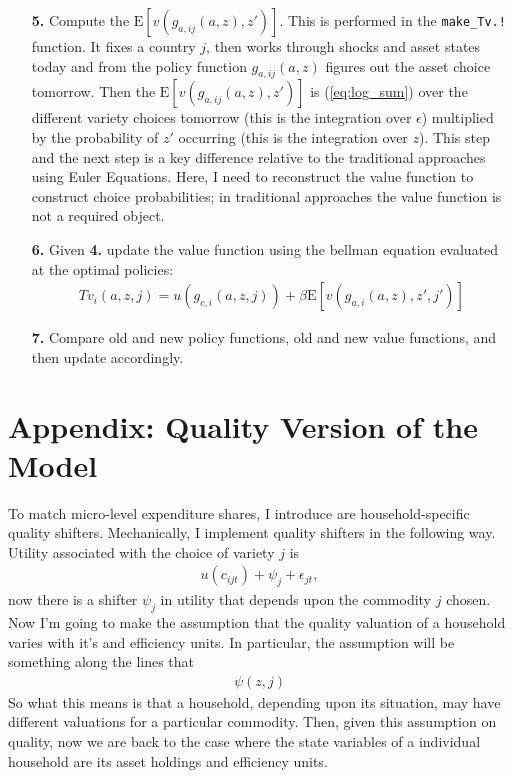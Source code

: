 \documentclass[12pt,pdftex]{article}
\begin{document}
\begin{onehalfspacing}
\begin{itemize}
\item[\textbf{5.}] Compute the $\mathrm{E}\left[ v(g_{a,ij}(a,z), z') \right]$. This is performed in the {\tt{make\_Tv.!}} function. It fixes a country $j$, then works through shocks and asset states today and from the policy function $g_{a,ij}(a,z)$ figures out the asset choice tomorrow. Then the $\mathrm{E}\left[ v(g_{a,ij}(a,z), z') \right]$ is (\ref{eq:log_sum}) over the different variety choices tomorrow (this is the integration over $\epsilon$) multiplied by the probability of $z'$ occurring (this is the integration over $z$). This step and the next step is a key difference relative to the traditional approaches using Euler Equations. Here, I need to reconstruct the value function to construct choice probabilities; in traditional approaches the value function is not a required object.

\item[\textbf{6.}] Given \textbf{4.} update the value function using the bellman equation evaluated at the optimal policies:
\begin{align}
Tv_{i}(a, z, j) = u(g_{c,i}(a,z,j)) + \beta \mathrm{E}\left[ v(g_{a,i}(a,z), z', j') \right]
\end{align}

\item[\textbf{7.}] Compare old and new policy functions, old and new value functions, and then update accordingly.
\end{itemize}

\section{Appendix: Quality Version of the Model}

To match micro-level expenditure shares, I introduce are household-specific quality shifters. Mechanically, I implement quality shifters in the following way. Utility associated with the choice of variety $j$ is
\begin{align}
u(c_{ijt}) + \psi_{j} + \epsilon_{jt}, \label{apx-eq:utility-quality}
\end{align}
now there is a shifter $\psi_{j}$ in utility that depends upon the commodity $j$ chosen. Now I'm going to make the assumption that the quality valuation of a household varies with it's and efficiency units. In particular, the assumption will be something along the lines that
\begin{align}
\psi(z, j)
\end{align}
So what this means is that a household, depending upon its situation, may have different valuations for a particular commodity. Then, given this assumption on quality, now we are back to the case where the state variables of a individual household are its asset holdings and efficiency units.


\end{onehalfspacing}
\end{document}
